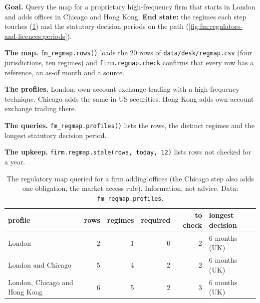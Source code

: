 \begin{tutorial}
\textbf{Goal.} Query the map for a proprietary high-frequency firm that starts in London and adds offices in Chicago and Hong Kong.
\textbf{End state:} the regimes each step touches (\cref{tab:fm:regulators-and-licences:profiles}) and the statutory decision periods on the path
(\cref{fig:fm:regulators-and-licences:periods}).
\begin{tutsteps}
\item \textbf{The map.} \texttt{fm\_regmap.rows()} loads the 20 rows of \texttt{data/desk/regmap.csv} (four jurisdictions, ten regimes) and
\texttt{firm.regmap.check} confirms that every row has a reference, an as-of month and a source.
\item \textbf{The profiles.} London: own-account exchange trading with a high-frequency technique. Chicago adds the same in US securities.
Hong Kong adds own-account exchange trading there.
\item \textbf{The queries.} \texttt{fm\_regmap.profiles()} lists the rows, the distinct regimes and the longest statutory decision period.
\item \textbf{The upkeep.} \texttt{firm.regmap.stale(rows, today, 12)} lists rows not checked for a year.
\end{tutsteps}
\end{tutorial}

\begin{table}[ht]
\centering\small
\begin{tabular}{lrrrrl}
\toprule
profile & rows & regimes & required & to check & longest decision \\
\midrule
London & 2 & 1 & 0 & 2 & 6 months (UK) \\
London and Chicago & 5 & 4 & 2 & 2 & 6 months (UK) \\
London, Chicago and Hong Kong & 6 & 5 & 2 & 3 & 6 months (UK) \\
\bottomrule
\end{tabular}
\caption{The regulatory map queried for a firm adding offices (the Chicago step also adds one obligation, the market access rule). Information,
not advice. Data: \texttt{fm\_regmap.profiles}.}\label{tab:fm:regulators-and-licences:profiles}
\end{table}


